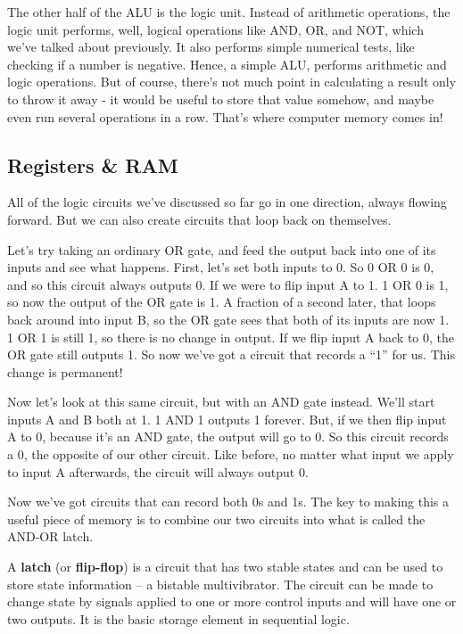 The other half of the ALU is the logic unit. Instead of arithmetic operations, the logic unit performs, well, logical
operations like AND, OR, and NOT, which we've talked about previously. It also performs simple numerical tests, like
checking if a number is negative. Hence, a simple ALU, performs arithmetic and logic operations. But of course,
there's not much point in calculating a result only to throw it away - it would be useful to store that value
somehow, and maybe even run several operations in a row. That's where computer memory comes in!

\subsection{Registers \& RAM}

All of the logic circuits we've discussed so far go in one direction, always flowing forward. But we can also create
circuits that loop back on themselves.

\be
Let's try taking an ordinary OR gate, and feed the output back into one of its inputs and see what happens. First,
let's set both inputs to 0. So 0 OR 0 is 0, and so this circuit always outputs 0. If we were to flip input A to 1. 1
OR 0 is 1, so now the output of the OR gate is 1. A fraction of a second later, that loops back around into input B,
so the OR gate sees that both of its inputs are now 1. 1 OR 1 is still 1, so there is no change in output. If we flip
input A back to 0, the OR gate still outputs 1. So now we've got a circuit that records a ``1'' for us. This change
is permanent!

\ee

\be
Now let's look at this same circuit, but with an AND gate instead. We'll start inputs A and B both at 1. 1 AND 1
outputs 1 forever. But, if we then flip input A to 0, because it's an AND gate, the output will go to 0. So this
circuit records a 0, the opposite of our other circuit. Like before, no matter what input we apply to input A
afterwards, the circuit will always output 0.

\ee

Now we've got circuits that can record both 0s and 1s. The key to making this a useful piece of memory is to combine
our two circuits into what is called the AND-OR latch.

A \textbf{latch} (or \textbf{flip-flop}) is a circuit that has two stable states and can be used to store state
information – a bistable multivibrator. The circuit can be made to change state by signals applied to one or more
control inputs and will have one or two outputs. It is the basic storage element in sequential logic.
\ed

